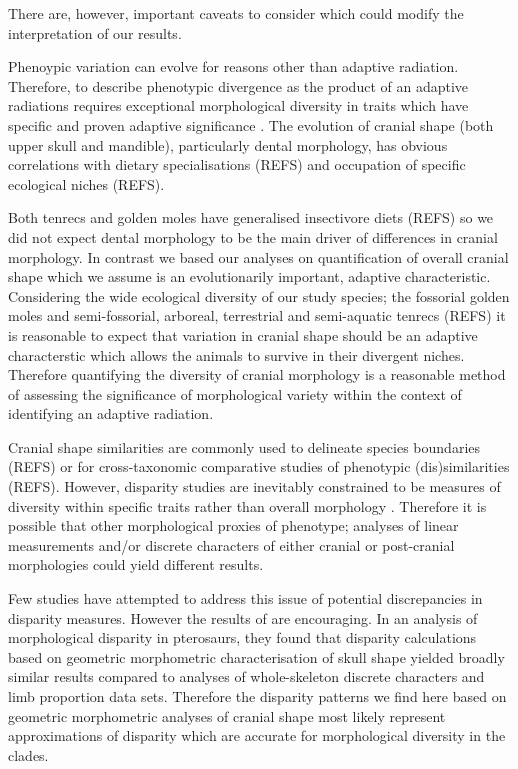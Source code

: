 \documentclass[12pt,a4paper]{article}
\begin{document}
There are, however, important caveats to consider which could modify the interpretation of our results.

Phenoypic variation can evolve for reasons other than adaptive radiation. Therefore, to describe phenotypic divergence as the product of an adaptive radiations requires exceptional morphological diversity in traits which have specific and proven adaptive significance \citep{Losos2010a}. The evolution of cranial shape (both upper skull and mandible), particularly dental morphology, has obvious correlations with dietary specialisations (REFS) and occupation of specific ecological niches (REFS). 


Both tenrecs and golden moles have generalised insectivore diets (REFS) so we did not expect dental morphology to be the main driver of differences in cranial morphology. In contrast we based our analyses on quantification of overall cranial shape which we assume is an evolutionarily important, adaptive characteristic. Considering the wide ecological diversity of our study species; the fossorial golden moles and semi-fossorial, arboreal, terrestrial and semi-aquatic tenrecs (REFS) it is reasonable to expect that variation in cranial shape should be an adaptive characterstic which allows the animals to survive in their divergent niches. Therefore quantifying the diversity of cranial morphology is a reasonable method of assessing the significance of morphological variety within the context of identifying an adaptive radiation.

Cranial shape similarities are commonly used to delineate species boundaries (REFS) or for cross-taxonomic comparative studies of phenotypic (dis)similarities (REFS). However, disparity studies are inevitably constrained to be measures of diversity within specific traits rather than overall morphology \citep{Roy1997}. Therefore it is possible that other morphological proxies of phenotype; analyses of linear measurements and/or discrete characters of either cranial or post-cranial morphologies could yield different results. 

Few studies have attempted to address this issue of potential discrepancies in disparity measures. However the results of \citep{Foth2012} are encouraging. In an analysis of morphological disparity in pterosaurs, they found that disparity calculations based on geometric morphometric characterisation of skull shape yielded broadly similar results compared to analyses of whole-skeleton discrete characters and limb proportion data sets. Therefore the disparity patterns we find here based on geometric morphometric analyses of cranial shape most likely represent approximations of disparity which are accurate for morphological diversity in the clades. 
\end{document}
